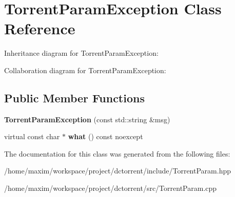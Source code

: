 \hypertarget{class_torrent_param_exception}{}\section{Torrent\+Param\+Exception Class Reference}
\label{class_torrent_param_exception}


Inheritance diagram for Torrent\+Param\+Exception\+:


Collaboration diagram for Torrent\+Param\+Exception\+:
\subsection*{Public Member Functions}
\begin{DoxyCompactItemize}
\item 
\mbox{\label{class_torrent_param_exception_a96e240b0809c3c13375f70803641909f}} 
{\bfseries Torrent\+Param\+Exception} (const std\+::string \&msg)
\item 
\mbox{\label{class_torrent_param_exception_a91e212adfd98c4a999bc37f35e12930a}} 
virtual const char $\ast$ {\bfseries what} () const noexcept
\end{DoxyCompactItemize}


The documentation for this class was generated from the following files\+:\begin{DoxyCompactItemize}
\item 
/home/maxim/workspace/project/dctorrent/include/Torrent\+Param.\+hpp\item 
/home/maxim/workspace/project/dctorrent/src/Torrent\+Param.\+cpp\end{DoxyCompactItemize}
